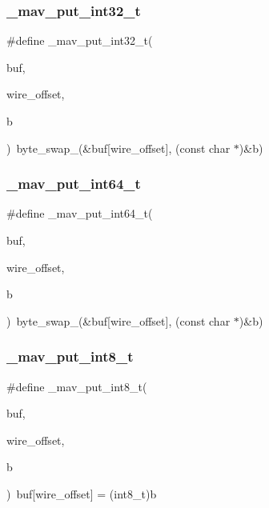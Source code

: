 \mbox{\label{protocol_8h_a87d4bee416a127b8bbca5e68abb8928f}} 
\subsubsection{\+\_\+mav\+\_\+put\+\_\+int32\+\_\+t}
{\footnotesize\ttfamily \#define \+\_\+mav\+\_\+put\+\_\+int32\+\_\+t(\begin{DoxyParamCaption}\item[{}]{buf,  }\item[{}]{wire\+\_\+offset,  }\item[{}]{b }\end{DoxyParamCaption})~byte\+\_\+swap\+\_(\&buf[wire\+\_\+offset], (const char $\ast$)\&b)}

\mbox{\label{protocol_8h_a75b8a7e267c9e3b37c706378a8ae8599}} 
\subsubsection{\+\_\+mav\+\_\+put\+\_\+int64\+\_\+t}
{\footnotesize\ttfamily \#define \+\_\+mav\+\_\+put\+\_\+int64\+\_\+t(\begin{DoxyParamCaption}\item[{}]{buf,  }\item[{}]{wire\+\_\+offset,  }\item[{}]{b }\end{DoxyParamCaption})~byte\+\_\+swap\+\_(\&buf[wire\+\_\+offset], (const char $\ast$)\&b)}

\mbox{\label{protocol_8h_af10c521f49722953319172c5dd3d030e}} 
\subsubsection{\+\_\+mav\+\_\+put\+\_\+int8\+\_\+t}
{\footnotesize\ttfamily \#define \+\_\+mav\+\_\+put\+\_\+int8\+\_\+t(\begin{DoxyParamCaption}\item[{}]{buf,  }\item[{}]{wire\+\_\+offset,  }\item[{}]{b }\end{DoxyParamCaption})~buf[wire\+\_\+offset] = (int8\+\_\+t)b}

